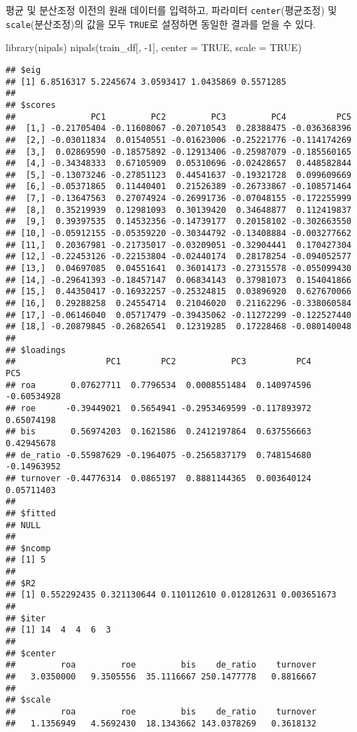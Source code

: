 \documentclass[
]{book}
\newenvironment{Shaded}{\begin{snugshade}}{\end{snugshade}}
\newcommand{\AttributeTok}[1]{\textcolor[rgb]{0.77,0.63,0.00}{#1}}
\newcommand{\ConstantTok}[1]{\textcolor[rgb]{0.00,0.00,0.00}{#1}}
\newcommand{\DecValTok}[1]{\textcolor[rgb]{0.00,0.00,0.81}{#1}}
\newcommand{\FunctionTok}[1]{\textcolor[rgb]{0.00,0.00,0.00}{#1}}
\newcommand{\NormalTok}[1]{#1}
\newcommand{\SpecialCharTok}[1]{\textcolor[rgb]{0.00,0.00,0.00}{#1}}
\begin{document}
평균 및 분산조정 이전의 원래 데이터를 입력하고, 파라미터 \texttt{center}(평균조정) 및 \texttt{scale}(분산조정)의 값을 모두 \texttt{TRUE}로 설정하면 동일한 결과를 얻을 수 있다.

\begin{Shaded}
\begin{Highlighting}[]
\FunctionTok{library}\NormalTok{(nipals)}
\FunctionTok{nipals}\NormalTok{(train\_df[, }\SpecialCharTok{{-}}\DecValTok{1}\NormalTok{], }\AttributeTok{center =} \ConstantTok{TRUE}\NormalTok{, }\AttributeTok{scale =} \ConstantTok{TRUE}\NormalTok{)}
\end{Highlighting}
\end{Shaded}

\begin{verbatim}
## $eig
## [1] 6.8516317 5.2245674 3.0593417 1.0435869 0.5571285
## 
## $scores
##               PC1         PC2         PC3         PC4          PC5
##  [1,] -0.21705404 -0.11608067 -0.20710543  0.28388475 -0.036368396
##  [2,] -0.03011834  0.01540551 -0.01623006 -0.25221776 -0.114174269
##  [3,]  0.02869590 -0.18575892 -0.12913406 -0.25987079 -0.185560165
##  [4,] -0.34348333  0.67105909  0.05310696 -0.02428657  0.448582844
##  [5,] -0.13073246 -0.27851123  0.44541637 -0.19321728  0.099609669
##  [6,] -0.05371865  0.11440401  0.21526389 -0.26733867 -0.108571464
##  [7,] -0.13647563  0.27074924 -0.26991736 -0.07048155 -0.172255999
##  [8,]  0.35219939  0.12981093  0.30139420  0.34648877  0.112419837
##  [9,]  0.39397535  0.14532356 -0.14739177  0.20158102 -0.302663550
## [10,] -0.05912155 -0.05359220 -0.30344792 -0.13408884 -0.003277662
## [11,]  0.20367981 -0.21735017 -0.03209051 -0.32904441  0.170427304
## [12,] -0.22453126 -0.22153804 -0.02440174  0.28178254 -0.094052577
## [13,]  0.04697085  0.04551641  0.36014173 -0.27315578 -0.055099430
## [14,] -0.29641393 -0.18457147  0.06834143  0.37981073  0.154041866
## [15,]  0.44350417 -0.16932257 -0.25324815  0.03896920  0.627670066
## [16,]  0.29288258  0.24554714  0.21046020  0.21162296 -0.338060584
## [17,] -0.06146040  0.05717479 -0.39435062 -0.11272299 -0.122527440
## [18,] -0.20879845 -0.26826541  0.12319285  0.17228468 -0.080140048
## 
## $loadings
##                  PC1        PC2           PC3          PC4         PC5
## roa       0.07627711  0.7796534  0.0008551484  0.140974596 -0.60534928
## roe      -0.39449021  0.5654941 -0.2953469599 -0.117893972  0.65074198
## bis       0.56974203  0.1621586  0.2412197864  0.637556663  0.42945678
## de_ratio -0.55987629 -0.1964075 -0.2565837179  0.748154680 -0.14963952
## turnover -0.44776314  0.0865197  0.8881144365  0.003640124  0.05711403
## 
## $fitted
## NULL
## 
## $ncomp
## [1] 5
## 
## $R2
## [1] 0.552292435 0.321130644 0.110112610 0.012812631 0.003651673
## 
## $iter
## [1] 14  4  4  6  3
## 
## $center
##         roa         roe         bis    de_ratio    turnover 
##   3.0350000   9.3505556  35.1116667 250.1477778   0.8816667 
## 
## $scale
##         roa         roe         bis    de_ratio    turnover 
##   1.1356949   4.5692430  18.1343662 143.0378269   0.3618132
\end{verbatim}
\end{document}
